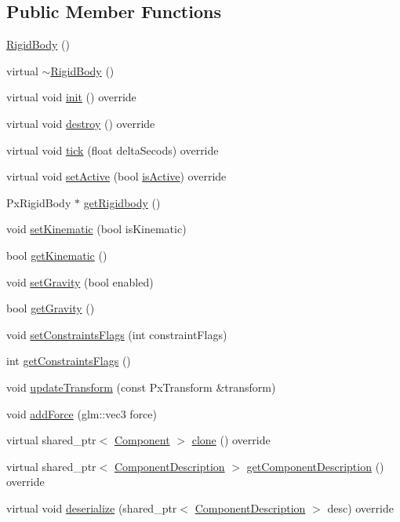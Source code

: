 \subsection*{Public Member Functions}
\begin{DoxyCompactItemize}
\item 
\hyperlink{class_rigid_body_a28203d38d278da0695ace20c66ee5f0a}{Rigid\+Body} ()
\item 
virtual \hyperlink{class_rigid_body_a4eade6e08e5a78c56822d2f42322c915}{$\sim$\+Rigid\+Body} ()
\item 
virtual void \hyperlink{class_rigid_body_aa419718573cb8042c3c7cbe671d69c4c}{init} () override
\item 
virtual void \hyperlink{class_rigid_body_a5ceba4a769ea558e5c7efd472e822248}{destroy} () override
\item 
virtual void \hyperlink{class_rigid_body_abf6a416e8bf2c2335bb2db145237ed4a}{tick} (float delta\+Secods) override
\item 
virtual void \hyperlink{class_rigid_body_a6f70cc83705a3a53b6ca3be6ff765a86}{set\+Active} (bool \hyperlink{class_component_a6dad4f819c0814eee8219e9b391cf583}{is\+Active}) override
\item 
Px\+Rigid\+Body $\ast$ \hyperlink{class_rigid_body_ab11c0e49a11a1521ed7124c9ea095368}{get\+Rigidbody} ()
\item 
void \hyperlink{class_rigid_body_a3272b6d18bc91c948fb6dadb2f7c1a39}{set\+Kinematic} (bool is\+Kinematic)
\item 
bool \hyperlink{class_rigid_body_ac93637a288e612654482eb8c75ce9d65}{get\+Kinematic} ()
\item 
void \hyperlink{class_rigid_body_af6c66756ca071aa93a64f604f7d2bc9a}{set\+Gravity} (bool enabled)
\item 
bool \hyperlink{class_rigid_body_af8caadbfee30eb55a2c408321544160f}{get\+Gravity} ()
\item 
void \hyperlink{class_rigid_body_a386d269dbc0e2584fa1c084c8eb86b08}{set\+Constraints\+Flags} (int constraint\+Flags)
\item 
int \hyperlink{class_rigid_body_aefe835ccb44041a78660d5a5241f412f}{get\+Constraints\+Flags} ()
\item 
void \hyperlink{class_rigid_body_a9401416338b535dd545002a5ba5e1f8e}{update\+Transform} (const Px\+Transform \&transform)
\item 
void \hyperlink{class_rigid_body_ac392797752276c328f0b0c00893ac3f1}{add\+Force} (glm\+::vec3 force)
\item 
virtual shared\+\_\+ptr$<$ \hyperlink{class_component}{Component} $>$ \hyperlink{class_rigid_body_a7acbed507a6deb5d83d381251ba224a8}{clone} () override
\item 
virtual shared\+\_\+ptr$<$ \hyperlink{class_component_description}{Component\+Description} $>$ \hyperlink{group__serialization__functions_ga0db7f5a90aa3397d0b3e0d2ae1ed1208}{get\+Component\+Description} () override
\item 
virtual void \hyperlink{group__serialization__functions_ga02c21f54650f36d529b4622efc9df372}{deserialize} (shared\+\_\+ptr$<$ \hyperlink{class_component_description}{Component\+Description} $>$ desc) override
\end{DoxyCompactItemize}
